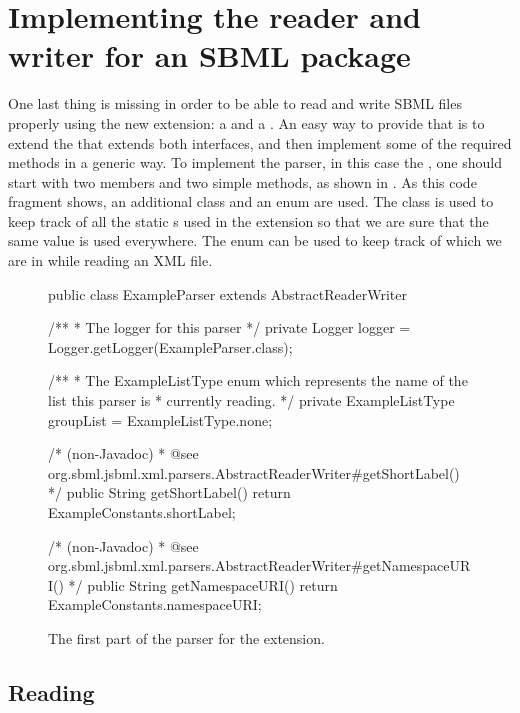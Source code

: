 
\section{Implementing the reader and writer for an SBML package}

One last thing is missing in order to be able to read and write SBML files properly
using the new extension: a  and a . An easy way to provide that is
to extend the \AbstractReaderWriter that extends both interfaces, and then implement some of 
the required methods in a generic way. To
implement the parser, in this case the , one should
start with two members and two simple methods, as shown in
. As this code fragment shows, an additional class
 and an enum  are used. The class 
is used to keep track of all the static \String{}s used in the extension so that we are sure 
that the same value is used everywhere. The enum   can be used to keep
track of which  we are in while reading an XML file.

\begin{figure}[htb]
  \begin{example}
public class ExampleParser extends AbstractReaderWriter {
  /**
   * The logger for this parser
   */
  private Logger logger = Logger.getLogger(ExampleParser.class);

  /**
   * The ExampleListType enum which represents the name of the list this parser is
   * currently reading.
   */
  private ExampleListType groupList = ExampleListType.none;

  /* (non-Javadoc)
   * @see org.sbml.jsbml.xml.parsers.AbstractReaderWriter#getShortLabel()
   */
  public String getShortLabel() {
    return ExampleConstants.shortLabel;
  }

  /* (non-Javadoc)
   * @see org.sbml.jsbml.xml.parsers.AbstractReaderWriter#getNamespaceURI()
   */
  public String getNamespaceURI() {
    return ExampleConstants.namespaceURI;
  }
}\end{example}
 \caption{The first part of the parser for the extension.}
 \label{lst:ModelExtParserClass}
\end{figure}


\subsection{Reading}

